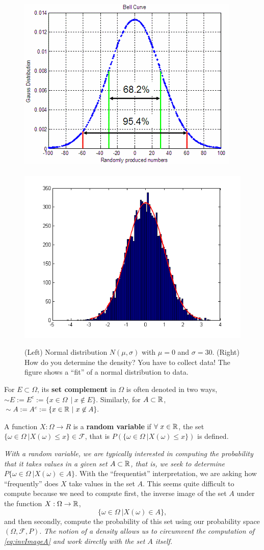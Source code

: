 \begin{figure}[bth]
	\centering
	\includegraphics[width=0.35\columnwidth]{graphics/Chap05/gauss-distribution-002.png}~~~~~~ ~~~~
	\includegraphics[width=0.35\columnwidth]{graphics/Chap05/O3lCB.png}
	\caption{(Left) Normal distribution $N(\mu, \sigma)$ with $\mu=0$ and $\sigma=30$. (Right) How do you determine the density? You have to collect data! The figure shows a ``fit'' of a normal distribution to data.}
\end{figure}



\begin{definition} For $E\subset \Omega$, its \textbf{set complement} in $\Omega$ is often denoted in two ways,
$\sim E := E^c := \{ x \in \Omega~~ | ~ x \not \in E\}.$  Similarly, for $A \subset \mathbb R$, $\sim A := A^c := \{ x \in \mathbb R~ | ~ x \not \in A\}.$
\end{definition}

\begin{definition} A function $X: \Omega \to R$ is a \textbf{random variable} if $\forall ~x \in \mathbb R$, the set $\{\omega \in \Omega~| X(\omega) \le x\} \in \mathscr{F} $, that is $P(\{\omega \in \Omega~| X(\omega) \le x\})$ is defined. 
\end{definition}

\emph{With a random variable, we are typically interested in computing the probability that it takes values in a given set $A\subset \mathbb R$, that is, we seek to determine $P\{\omega \in \Omega~| X(\omega) \in A\}$.} With the ``frequentist'' interpretation, we are asking how ``frequently'' does $X$ take values in the set $A$. This seems quite difficult to compute because we need to compute first, the inverse image of the set $A$ under the function $X:\Omega \to \mathbb R$, 
\begin{equation}
    \label{eq:invImageA}
    \{\omega \in \Omega~| X(\omega) \in A\},
\end{equation}
and then secondly, compute the probability of this set using our probability space $(\Omega, \mathscr{F}, P)$. \emph{The notion of a \emph{density} allows us to circumvent the computation of \eqref{eq:invImageA} and work directly with the set $A$ itself.} \\


